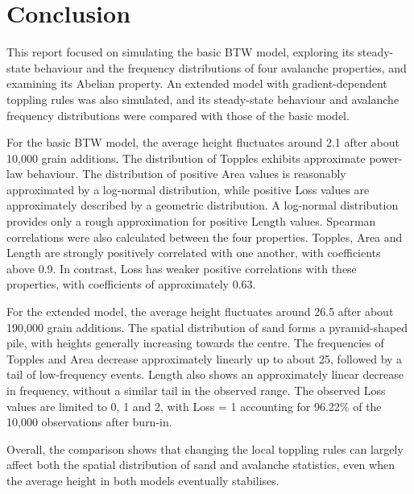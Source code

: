 \chapter{Conclusion}\label{ch: Conclusion}
This report focused on simulating the basic BTW model, exploring its steady-state behaviour and the frequency distributions of four avalanche properties, and examining its Abelian property. An extended model with gradient-dependent toppling rules was also simulated, and its steady-state behaviour and avalanche frequency distributions were compared with those of the basic model.

For the basic BTW model, the average height fluctuates around 2.1 after about 10,000 grain additions. The distribution of Topples exhibits approximate power-law behaviour. The distribution of positive Area values is reasonably approximated by a log-normal distribution, while positive Loss values are approximately described by a geometric distribution. A log-normal distribution provides only a rough approximation for positive Length values. Spearman correlations were also calculated between the four properties. Topples, Area and Length are strongly positively correlated with one another, with coefficients above 0.9. In contrast, Loss has weaker positive correlations with these properties, with coefficients of approximately 0.63.

For the extended model, the average height fluctuates around 26.5 after about 190,000 grain additions. The spatial distribution of sand forms a pyramid-shaped pile, with heights generally increasing towards the centre. The frequencies of Topples and Area decrease approximately linearly up to about 25, followed by a tail of low-frequency events. Length also shows an approximately linear decrease in frequency, without a similar tail in the observed range. The observed Loss values are limited to 0, 1 and 2, with Loss = 1 accounting for 96.22\% of the 10,000 observations after burn-in.

Overall, the comparison shows that changing the local toppling rules can largely affect both the spatial distribution of sand and avalanche statistics, even when the average height in both models eventually stabilises.